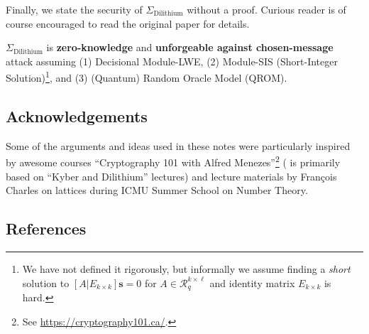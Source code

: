 \documentclass{template}
\begin{document}
Finally, we state the security of $\Sigma_{\text{Dilithium}}$ without a proof.
Curious reader is of course encouraged to read the original paper
\cite{dilithium} for details.
\begin{proposition}
    $\Sigma_{\text{Dilithium}}$ is \textbf{zero-knowledge} and
    \textbf{unforgeable against chosen-message} attack assuming (1) Decisional
    Module-LWE, (2) Module-SIS (Short-Integer Solution)\footnote{We have not
    defined it rigorously, but informally we assume finding a \textit{short}
    solution to $[A|E_{k \times k}]\mathbf{s}=0$ for $A \in \mathcal{R}_q^{k
    \times \ell}$ and identity matrix $E_{k \times k}$ is hard.}, and (3)
    (Quantum) Random Oracle Model (QROM).
\end{proposition}

\subsection*{Acknowledgements}

Some of the arguments and ideas used in these notes were particularly inspired
by awesome courses ``Cryptography 101 with Alfred Menezes''\footnote{See
\url{https://cryptography101.ca/}.} ( is primarily based
on ``Kyber and Dilithium'' lectures) and lecture materials by François Charles
on lattices during ICMU Summer School on Number Theory.

\subsection*{References}
\footnotesize
\renewcommand{\refname}{\vspace{-1em}}


\end{document}
